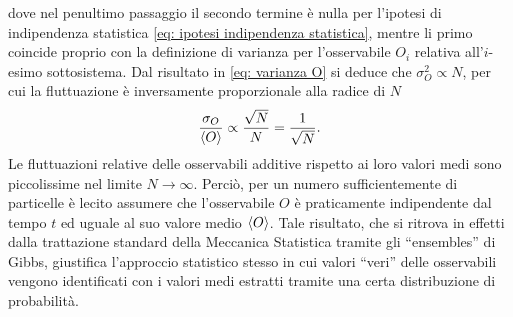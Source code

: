 dove nel penultimo passaggio il secondo termine è nulla per l'ipotesi di indipendenza statistica \eqref{eq: ipotesi indipendenza statistica}, mentre li primo coincide proprio con la definizione di varianza per l'osservabile $O_i$ relativa all'$i$-esimo sottosistema. Dal risultato in \eqref{eq: varianza O} si deduce che $\sigma^2_O \propto N$, per cui la fluttuazione è inversamente proporzionale alla radice di $N$
\begin{equation}
    \frac{\sigma_O}{\langle O \rangle} \propto \frac{\sqrt{N}}{N} = \frac{1}{\sqrt{N}}.
\end{equation}
Le fluttuazioni relative delle osservabili additive rispetto ai loro valori medi sono piccolissime nel limite $N\to\infty$. Perciò, per un numero sufficientemente di particelle è lecito assumere che l'osservabile $O$ è praticamente indipendente dal tempo $t$ ed uguale al suo valore medio $\langle O \rangle$. Tale risultato, che si ritrova in effetti dalla trattazione standard della Meccanica Statistica tramite gli ``ensembles'' di Gibbs, giustifica l'approccio statistico stesso in cui valori ``veri'' delle
osservabili vengono identificati con i valori medi estratti tramite una certa distribuzione di probabilità.

